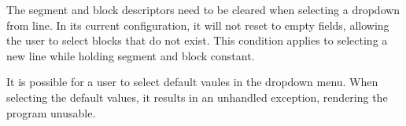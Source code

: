 
\begin{DoxyRefList}
\item[\label{bug__bug000001}%
\Hypertarget{bug__bug000001}%
Member \hyperlink{classTrackModel_1_1TrackGUI_aa7c85f553a7540a8f20b2092d8a6ca8a}{Track\+Model.Track\+G\+UI.action\+Performed} (Action\+Event e)]The segment and block descriptors need to be cleared when selecting a dropdown from line. In its current configuration, it will not reset to empty fields, allowing the user to select blocks that do not exist. This condition applies to selecting a new line while holding segment and block constant.

It is possible for a user to select default vaules in the dropdown menu. When selecting the default values, it results in an unhandled exception, rendering the program unusable. 
\end{DoxyRefList}